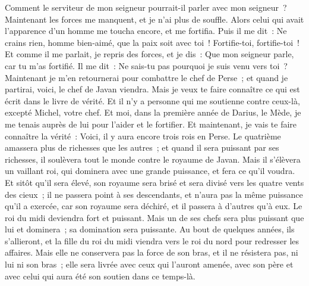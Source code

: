 \begin{multicols}{2}
Comment le serviteur de mon seigneur pourrait-il parler avec mon seigneur~? Maintenant les forces me manquent, et je n'ai plus de souffle.
Alors celui qui avait l'apparence d'un homme me toucha encore, et me fortifia.
Puis il me dit~: Ne crains rien, homme bien-aimé, que la paix soit avec toi~! Fortifie-toi, fortifie-toi~! Et comme il me parlait, je repris des forces, et je dis~: Que mon seigneur parle, car tu m'as fortifié.
Il me dit~: Ne sais-tu pas pourquoi je suis venu vers toi~? Maintenant je m'en retournerai pour combattre le chef de Perse~; et quand je partirai, voici, le chef de Javan viendra.
Mais je veux te faire connaître ce qui est écrit dans le livre de vérité. Et il n'y a personne qui me soutienne contre ceux-là, excepté Michel, votre chef.
\VerseOne{}Et moi, dans la première année de Darius, le Mède, je me tenais auprès de lui pour l'aider et le fortifier.
Et maintenant, je vais te faire connaître la vérité~: Voici, il y aura encore trois rois en Perse. Le quatrième amassera plus de richesses que les autres~; et quand il sera puissant par ses richesses, il soulèvera tout le monde contre le royaume de Javan.
Mais il s'élèvera un vaillant roi, qui dominera avec une grande puissance, et fera ce qu'il voudra.
Et sitôt qu'il sera élevé, son royaume sera brisé et sera divisé vers les quatre vents des cieux~; il ne passera point à ses descendants, et n'aura pas la même puissance qu'il a exercée, car son royaume sera déchiré, et il passera à d'autres qu'à eux.
Le roi du midi deviendra fort et puissant. Mais un de ses chefs sera plus puissant que lui et dominera~; sa domination sera puissante.
Au bout de quelques années, ils s'allieront, et la fille du roi du midi viendra vers le roi du nord pour redresser les affaires. Mais elle ne conservera pas la force de son bras, et il ne résistera pas, ni lui ni son bras~; elle sera livrée avec ceux qui l'auront amenée, avec son père et avec celui qui aura été son soutien dans ce temps-là.

\end{multicols}
